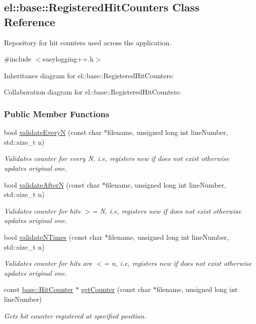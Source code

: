 \hypertarget{a00071}{}\subsection{el\+:\+:base\+:\+:Registered\+Hit\+Counters Class Reference}
\label{a00071}


Repository for hit counters used across the application.  




{\ttfamily \#include $<$easylogging++.\+h$>$}



Inheritance diagram for el\+:\+:base\+:\+:Registered\+Hit\+Counters\+:


Collaboration diagram for el\+:\+:base\+:\+:Registered\+Hit\+Counters\+:
\subsubsection*{Public Member Functions}
\begin{DoxyCompactItemize}
\item 
bool \hyperlink{a00071_a18fecedc6be778cfd63e30cc42fb9c82}{validate\+Every\+N} (const char $\ast$filename, unsigned long int line\+Number, std\+::size\+\_\+t n)
\begin{DoxyCompactList}\small\item\em Validates counter for every N, i.\+e, registers new if does not exist otherwise updates original one. \end{DoxyCompactList}\item 
bool \hyperlink{a00071_af6fa32ffd76776863d8bd2f0e9b341fc}{validate\+After\+N} (const char $\ast$filename, unsigned long int line\+Number, std\+::size\+\_\+t n)
\begin{DoxyCompactList}\small\item\em Validates counter for hits $>$= N, i.\+e, registers new if does not exist otherwise updates original one. \end{DoxyCompactList}\item 
bool \hyperlink{a00071_aa270c1b9a8cc3a4d12cea45e07560d98}{validate\+N\+Times} (const char $\ast$filename, unsigned long int line\+Number, std\+::size\+\_\+t n)
\begin{DoxyCompactList}\small\item\em Validates counter for hits are $<$= n, i.\+e, registers new if does not exist otherwise updates original one. \end{DoxyCompactList}\item 
\hypertarget{a00071_a0ca8cd04da5686048644e8cc1533b561}{}const \hyperlink{a00036}{base\+::\+Hit\+Counter} $\ast$ \hyperlink{a00071_a0ca8cd04da5686048644e8cc1533b561}{get\+Counter} (const char $\ast$filename, unsigned long int line\+Number)\label{a00071_a0ca8cd04da5686048644e8cc1533b561}

\begin{DoxyCompactList}\small\item\em Gets hit counter registered at specified position. \end{DoxyCompactList}\end{DoxyCompactItemize}
